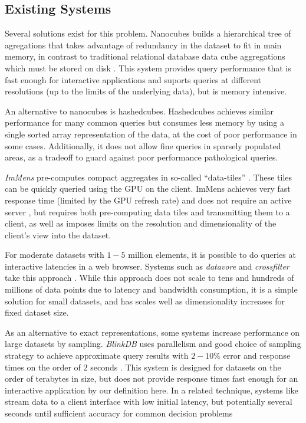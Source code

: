 \documentclass[journal]{vgtc}                %
\begin{document}
\subsection{Existing Systems}

Several solutions exist for this problem. Nanocubes builds a
hierarchical tree of agregations that takes advantage of redundancy in the dataset
to fit in main memory, in contrast to
traditional relational database data cube aggregations which must be stored on
disk \cite{nanocubes}. This system provides query performance that is fast
enough for interactive applications and suports queries at different
resolutions (up to the limits of the underlying data), but is memory intensive.

An alternative to nanocubes is hashedcubes. Hashedcubes 
achieves similar performance for many common queries but consumes less memory
by using a single sorted array representation of the data, at the cost of poor 
performance in some cases.
Additionally, it does not allow fine queries in sparsely populated areas, as a
tradeoff to guard against poor performance pathological queries.

\textit{ImMens} pre-computes compact aggregates in so-called
``data-tiles'' \cite{2013-immens}. These tiles can be quickly queried using the
GPU on the client.  ImMens achieves very fast response time (limited by the GPU
refresh rate) and does not require an active server , but requires
both pre-computing data tiles and transmitting them to a client, as well as imposes limits on the resolution and dimensionality of the client's view into the dataset.

For moderate datasets with $1-5$ million elements, it is possible to do
queries at interactive latencies in a web browser. Systems such as
\textit{datavore} and \textit{crossfilter} take this approach
\cite{crossfilter,datavore}. While this approach does not scale to tens and
hundreds of millions of data points due to latency and bandwidth consumption,
it is a simple solution for small datasets, and has scales well as dimensionality increases for fixed dataset size.

As an alternative to exact representations, some systems increase performance on large datasets by sampling.
\textit{BlinkDB} uses parallelism and good choice of sampling strategy to
achieve approximate query results with $2-10\%$ error and response times on the
order of $2$ seconds \cite{blinkdb}. This system is designed for datasets on
the order of terabytes in size, but does not provide response times fast enough
for an interactive application by our definition here.
In a related technique, systems like \textit{} stream data to a client interface with low initial latency, but potentially several seconds until sufficient accuracy for common decision problems \cite{trust me} 
\end{document}
